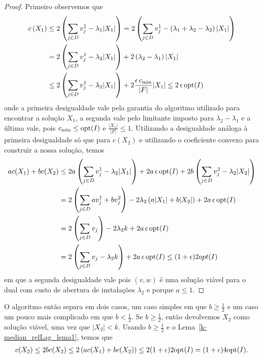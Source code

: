 \begin{proof}
Primeiro observemos que 
\begin{subequations}
    \begin{align*}
        c\left(X_1\right) &\leq 2\left(\sum_{j \in D} v_j^1 - \lambda_1|X_1|\right) = 2\left(\sum_{j\in D} v_j^1 - \left( \lambda_1 + \lambda_2 - \lambda_2 \right)|X_1|\right)\\
        & = 2 \left(\sum_{j \in D} v_j^1 - \lambda_2 |X_1| \right) + 2 \left(\lambda_2 - \lambda_1\right) |X_1| \\
        &\leq 2 \left(\sum_{j \in D} v_j^1 - \lambda_2 |X_1| \right) + 2\frac{\epsilon\, c_{\min}}{|F|}|X_1| \leq 2 \, \epsilon \, \mathrm{opt}(I)
    \end{align*}
\end{subequations}
onde a primeira desigualdade vale pela garantia do algoritmo utilizado para encontrar a solução $X_1$, a segunda vale pelo limitante imposto para $\lambda_2 - \lambda_1$ e a última vale, pois $c_{\min} \leq \mathrm{opt}(I)$ e $\frac{|X_1|}{|F|} \leq 1$. Utilizando a desigualdade análoga à primeira desigualdade só que para $c(X_2)$ e utilizando o coeficiente convexo para construir a nossa solução, temos
\begin{subequations}
    \begin{align*}
        ac(X_1) + b c(X_2) &\leq 2a \left(\sum_{j\in D} v_j^1 - \lambda_2|X_1|\right) + 2a\, \epsilon\,\mathrm{opt}(I) + 2b\left(\sum_{j\in D} v_j^2 - \lambda_2|X_2|\right) \\
        &= 2\left(\sum_{j \in D} a v_j^1 + b v_j^2\right) - 2\lambda_2\left( a|X_1| + b|X_2|\right) + 2a\,\epsilon\,\mathrm{opt}(I)\\
        & = 2\left(\sum_{j\in D } v_j\right) - 2\lambda_2 k + 2a\,\epsilon\,\mathrm{opt}(I)\\
        & = 2\left( \sum_{j \in D } v_j -\lambda_2 k\right) + 2a\,\epsilon\,\mathrm{opt}(I) \leq (1+\epsilon)2opt(I)
    \end{align*}
\end{subequations}
em que a segunda desigualdade vale pois $(v,w)$ é uma solução viável para o dual com custo de abertura de instalações $\lambda_2$ e porque $a \leq 1$.
\end{proof}

O algoritmo então separa em dois casos, um caso simples em que $b \geq \frac{1}{2}$ e um caso um pouco mais complicado em que $b < \frac{1}{2}$. Se $b \geq \frac{1}{2}$, então devolvemos $X_2$ como solução viável, uma vez que $|X_2| < k$. Usando $b \geq \frac{1}{2}$ e o Lema~\ref{k-median_relLag_lema1}, temos que
\begin{subequations}
    \begin{align*}
        c(X_2) \leq 2bc(X_2) \leq 2\left(ac(X_1) + bc(X_2) \right) \leq 2(1+\epsilon) 2\mathrm{opt}(I) = (1+\epsilon)4\mathrm{opt}(I).
    \end{align*}
\end{subequations}

